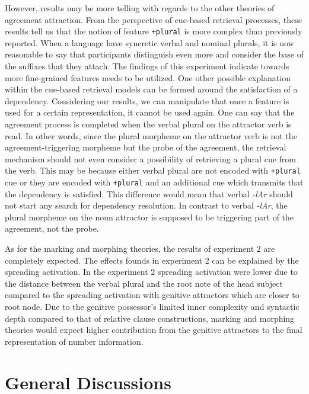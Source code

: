 \documentclass[
  english,
  doc,floatsintext]{apa6}
\begin{document}
However, results may be more telling with regards to the other theories of agreement attraction. From the perspective of cue-based retrieval processes, these results tell us that the notion of feature \texttt{+plural} is more complex than previously reported. When a language have syncretic verbal and nominal plurals, it is now reasonable to say that participants distinguish even more and consider the base of the suffixes that they attach. The findings of this experiment indicate towards more fine-grained features needs to be utilized. One other possible explanation within the cue-based retrieval models can be formed around the satisfaction of a dependency. Considering our results, we can manipulate that once a feature is used for a certain representation, it cannot be used again. One can say that the agreement process is completed when the verbal plural on the attractor verb is read. In other words, since the plural morpheme on the attractor verb is not the agreement-triggering morpheme but the probe of the agreement, the retrieval mechanism should not even consider a possibility of retrieving a plural cue from the verb. This may be because either verbal plural are not encoded with \texttt{+plural} cue or they are encoded with \texttt{+plural} and an additional cue which transmits that the dependency is satisfied. This difference would mean that verbal \textit{-lAr} should not start any search for dependency resolution. In contrast to verbal \textit{-lAr}, the plural morpheme on the noun attractor is supposed to be triggering part of the agreement, not the probe.

As for the marking and morphing theories, the results of experiment 2 are completely expected. The effects founds in experiment 2 can be explained by the spreading activation. In the experiment 2 spreading activation were lower due to the distance between the verbal plural and the root note of the head subject compared to the spreading activation with genitive attractors which are closer to root node. Due to the genitive possessor's limited inner complexity and syntactic depth compared to that of relative clause constructions, marking and morphing theories would expect higher contribution from the genitive attractors to the final representation of number information.

\hypertarget{general-discussions}{%
\section{General Discussions}\label{general-discussions}}
\end{document}
